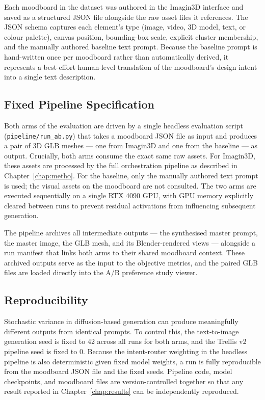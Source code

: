 Each moodboard in the dataset was authored in the Imagin3D interface and saved as a structured JSON file alongside the raw asset files it references. The JSON schema captures each element's type (image, video, 3D model, text, or colour palette), canvas position, bounding-box scale, explicit cluster membership, and the manually authored baseline text prompt. Because the baseline prompt is hand-written once per moodboard rather than automatically derived, it represents a best-effort human-level translation of the moodboard's design intent into a single text description.

\subsection{Fixed Pipeline Specification}
\label{sec:fixedpipeline}

Both arms of the evaluation are driven by a single headless evaluation script (\texttt{pipeline/run\_ab.py}) that takes a moodboard JSON file as input and produces a pair of 3D GLB meshes --- one from Imagin3D and one from the baseline --- as output. Crucially, both arms consume the exact same raw assets. For Imagin3D, these assets are processed by the full orchestration pipeline as described in Chapter~\ref{chap:metho}. For the baseline, only the manually authored text prompt is used; the visual assets on the moodboard are not consulted. The two arms are executed sequentially on a single RTX 4090 GPU, with GPU memory explicitly cleared between runs to prevent residual activations from influencing subsequent generation.

The pipeline archives all intermediate outputs --- the synthesised master prompt, the master image, the GLB mesh, and its Blender-rendered views --- alongside a run manifest that links both arms to their shared moodboard context. These archived outputs serve as the input to the objective metrics, and the paired GLB files are loaded directly into the A/B preference study viewer.

\subsection{Reproducibility}

Stochastic variance in diffusion-based generation can produce meaningfully different outputs from identical prompts. To control this, the text-to-image generation seed is fixed to 42 across all runs for both arms, and the Trellis v2 pipeline seed is fixed to 0. Because the intent-router weighting in the headless pipeline is also deterministic given fixed model weights, a run is fully reproducible from the moodboard JSON file and the fixed seeds. Pipeline code, model checkpoints, and moodboard files are version-controlled together so that any result reported in Chapter~\ref{chap:results} can be independently reproduced.

